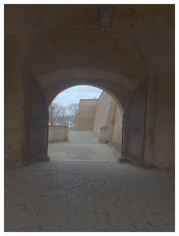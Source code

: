 \begin{figure}[h!]
  \centering
  \begin{subfigure}{0.3\textwidth}
      \includegraphics[width=\textwidth]{figures/tests/tmo/man3}
  \end{subfigure}
  ~
  \begin{subfigure}{0.3\textwidth}

\end{subfigure}
\end{figure}
